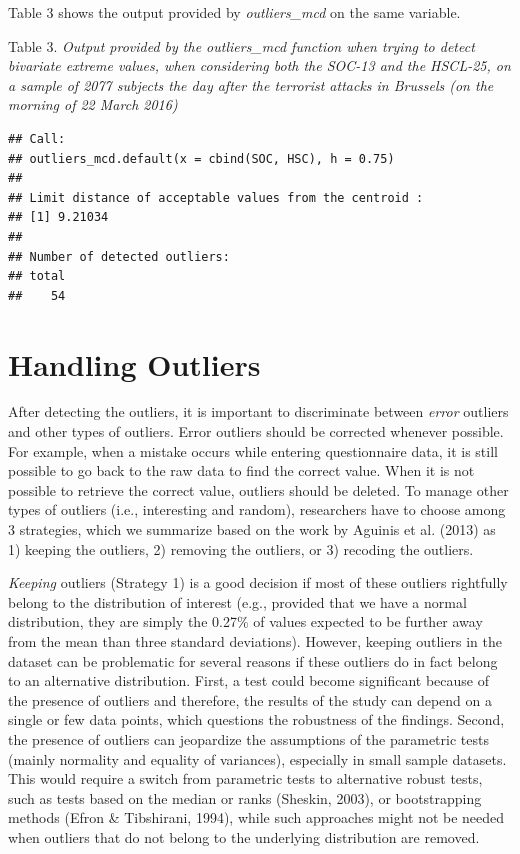 \documentclass[man,floatsintext]{apa6}
\begin{document}
Table 3 shows the output provided by \emph{outliers\_mcd} on the same variable.

Table 3.
\emph{Output provided by the outliers\_mcd function when trying to detect bivariate extreme values, when considering both the SOC-13 and the HSCL-25, on a sample of 2077 subjects the day after the terrorist attacks in Brussels (on the morning of 22 March 2016)}

\begin{verbatim}
## Call:
## outliers_mcd.default(x = cbind(SOC, HSC), h = 0.75)
## 
## Limit distance of acceptable values from the centroid :
## [1] 9.21034
## 
## Number of detected outliers:
## total 
##    54
\end{verbatim}

\hypertarget{handling-outliers}{%
\section{Handling Outliers}\label{handling-outliers}}

After detecting the outliers, it is important to discriminate between \emph{error} outliers and other types of outliers. Error outliers should be corrected whenever possible. For example, when a mistake occurs while entering questionnaire data, it is still possible to go back to the raw data to find the correct value. When it is not possible to retrieve the correct value, outliers should be deleted. To manage other types of outliers (i.e., interesting and random), researchers have to choose among 3 strategies, which we summarize based on the work by Aguinis et al. (2013) as 1) keeping the outliers, 2) removing the outliers, or 3) recoding the outliers.

\emph{Keeping} outliers (Strategy 1) is a good decision if most of these outliers rightfully belong to the distribution of interest (e.g., provided that we have a normal distribution, they are simply the 0.27\% of values expected to be further away from the mean than three standard deviations). However, keeping outliers in the dataset can be problematic for several reasons if these outliers do in fact belong to an alternative distribution. First, a test could become significant because of the presence of outliers and therefore, the results of the study can depend on a single or few data points, which questions the robustness of the findings. Second, the presence of outliers can jeopardize the assumptions of the parametric tests (mainly normality and equality of variances), especially in small sample datasets. This would require a switch from parametric tests to alternative robust tests, such as tests based on the median or ranks (Sheskin, 2003), or bootstrapping methods (Efron \& Tibshirani, 1994), while such approaches might not be needed when outliers that do not belong to the underlying distribution are removed.
\end{document}
